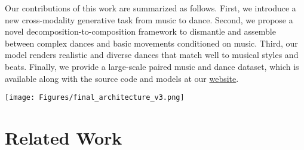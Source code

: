 \documentclass{article}
\newlength\figmargin
\newlength\secmargin
\newcommand{\subsecref}[1]{Section~\ref{subsec:#1}}
\begin{document}
Our contributions of this work are summarized as follows. 
First, we introduce a new cross-modality generative task from music to dance. 
Second, we propose a novel decomposition-to-composition framework to dismantle and assemble between complex dances and basic movements conditioned on music. 
Third, our model renders realistic and diverse dances that match well to musical styles and beats. 
Finally, we provide a large-scale paired music and dance dataset, which is available along with the source code and models at our \href{https://github.com/NVlabs/Dance2Music}{website}.

\begin{figure*}[t]
	\centering
	\texttt{[image: Figures/final\_architecture\_v3.png]}
	\caption{\textbf{A schematic overview of the decomposition-to-composition framework.} 
	In the top-down decomposition phase (\subsecref{stage1}), we normalize the dance units that are segmented from a real dancing sequence using a kinematic beat detector.
We then train the \texttt{DU-VAE} to model the dance units.
In the bottom-up composition phase (\subsecref{stage2}), given a pair of music and dance, we leverage the \texttt{MM-GAN} to learn how to organize the dance units conditioned on the given music.
In the testing phase (\subsecref{test}), we extract style and beats from the input music, then synthesize a sequence of dance units in a recurrent manner,
and in the end, apply the beat warper to the generated dance unit sequence to render the output dance.}
    \label{fig:architecture}
    \vspace{\figmargin}
\end{figure*}





\section{Related Work}
\label{sec:related}
\vspace{\secmargin}
\end{document}
